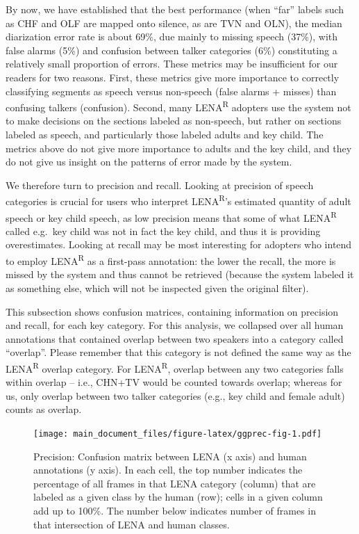 \documentclass[english,table,man,floatsintext]{apa6}
\begin{document}
By now, we have established that the best performance (when \enquote{far} labels such as CHF and OLF are mapped onto silence, as are TVN and OLN), the median diarization error rate is about 69\%, due mainly to missing speech (37\%), with false alarms (5\%) and confusion between talker categories (6\%) constituting a relatively small proportion of errors. These metrics may be insufficient for our readers for two reasons. First, these metrics give more importance to correctly classifying segments as speech versus non-speech (false alarms + misses) than confusing talkers (confusion). Second, many LENA\textsuperscript{R} adopters use the system not to make decisions on the sections labeled as non-speech, but rather on sections labeled as speech, and particularly those labeled adults and key child. The metrics above do not give more importance to adults and the key child, and they do not give us insight on the patterns of error made by the system.

We therefore turn to precision and recall. Looking at precision of speech categories is crucial for users who interpret LENA\textsuperscript{R}'s estimated quantity of adult speech or key child speech, as low precision means that some of what LENA\textsuperscript{R} called e.g.~key child was not in fact the key child, and thus it is providing overestimates. Looking at recall may be most interesting for adopters who intend to employ LENA\textsuperscript{R} as a first-pass annotation: the lower the recall, the more is missed by the system and thus cannot be retrieved (because the system labeled it as something else, which will not be inspected given the original filter).

This subsection shows confusion matrices, containing information on precision and recall, for each key category. For this analysis, we collapsed over all human annotations that contained overlap between two speakers into a category called \enquote{overlap}. Please remember that this category is not defined the same way as the LENA\textsuperscript{R} overlap category. For LENA\textsuperscript{R}, overlap between any two categories falls within overlap -- i.e., CHN+TV would be counted towards overlap; whereas for us, only overlap between two talker categories (e.g., key child and female adult) counts as overlap.

\begin{figure}
\centering
\texttt{[image: main\_document\_files/figure-latex/ggprec-fig-1.pdf]}
\caption{\label{fig:ggprec-fig}Precision: Confusion matrix between LENA (x axis) and human annotations (y axis). In each cell, the top number indicates the percentage of all frames in that LENA category (column) that are labeled as a given class by the human (row); cells in a given column add up to 100\%. The number below indicates number of frames in that intersection of LENA and human classes.}
\end{figure}
\end{document}
